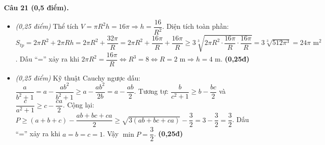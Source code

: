 \documentclass[11pt,a4paper]{article}
\begin{document}
\vspace{1mm}
\textbf{Câu 21 (0,5 điểm).}
\begin{itemize}
  \item[a)] \textit{(0,25 điểm)} Thể tích $V = \pi R^2 h = 16\pi \Rightarrow h = \dfrac{16}{R^2}$. Diện tích toàn phần:
  $S_{tp} = 2\pi R^2 + 2\pi R h = 2\pi R^2 + \dfrac{32\pi}{R} = 2\pi R^2 + \dfrac{16\pi}{R} + \dfrac{16\pi}{R} \ge 3\sqrt[3]{2\pi R^2 \cdot \dfrac{16\pi}{R} \cdot \dfrac{16\pi}{R}} = 3\sqrt[3]{512\pi^3} = 24\pi\text{ m}^2$. Dấu ``='' xảy ra khi $2\pi R^2 = \dfrac{16\pi}{R} \Leftrightarrow R^3 = 8 \Leftrightarrow R = 2\text{ m} \Rightarrow h = 4\text{ m}$. \hfill \textbf{(0,25đ)}
  \item[b)] \textit{(0,25 điểm)} Kỹ thuật Cauchy ngược dấu: $\dfrac{a}{b^2+1} = a - \dfrac{ab^2}{b^2+1} \ge a - \dfrac{ab^2}{2b} = a - \dfrac{ab}{2}$. Tương tự: $\dfrac{b}{c^2+1} \ge b - \dfrac{bc}{2}$ và $\dfrac{c}{a^2+1} \ge c - \dfrac{ca}{2}$. Cộng lại: $P \ge (a+b+c) - \dfrac{ab+bc+ca}{2} \ge \sqrt{3(ab+bc+ca)} - \dfrac{3}{2} = 3 - \dfrac{3}{2} = \dfrac{3}{2}$. Dấu ``='' xảy ra khi $a = b = c = 1$. Vậy $\min P = \dfrac{3}{2}$. \hfill \textbf{(0,25đ)}
\end{itemize}
\end{document}
